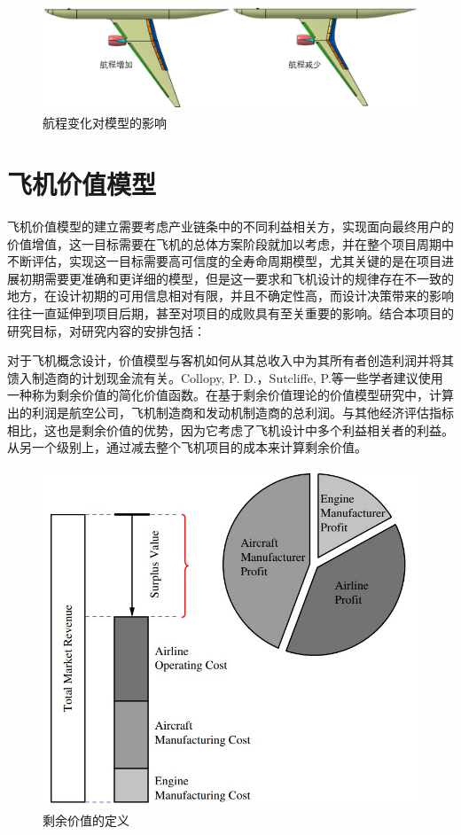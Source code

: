 \documentclass[12pt,a4paper]{report}
\begin{document}
\begin{figure}[hbt!]
\centering
\includegraphics[width=1\textwidth]{Range.PNG}
\caption{航程变化对模型的影响}
\label{fig:Range}
\end{figure}

\section{飞机价值模型}

飞机价值模型的建立需要考虑产业链条中的不同利益相关方，实现面向最终用户的价值增值，这一目标需要在飞机的总体方案阶段就加以考虑，并在整个项目周期中不断评估，实现这一目标需要高可信度的全寿命周期模型，尤其关键的是在项目进展初期需要更准确和更详细的模型，但是这一要求和飞机设计的规律存在不一致的地方，在设计初期的可用信息相对有限，并且不确定性高，而设计决策带来的影响往往一直延伸到项目后期，甚至对项目的成败具有至关重要的影响。结合本项目的研究目标，对研究内容的安排包括：

对于飞机概念设计，价值模型与客机如何从其总收入中为其所有者创造利润并将其馈入制造商的计划现金流有关。Collopy, P. D.\cite{collopy1997surplus}，Sutcliffe, P.\cite{sutcliffe2010development}等一些学者建议使用一种称为剩余价值的简化价值函数。在基于剩余价值理论的价值模型研究中，计算出的利润是航空公司，飞机制造商和发动机制造商的总利润。与其他经济评估指标相比，这也是剩余价值的优势，因为它考虑了飞机设计中多个利益相关者的利益。从另一个级别上，通过减去整个飞机项目的成本来计算剩余价值。

\begin{figure}[!htp]
  \centering
  \includegraphics[width=.6\textwidth]{eps/剩余价值组成.jpg}
  \caption{剩余价值的定义\cite{Desai2017development}}
 \label{fig:surplusvalue}
\end{figure}
\end{document}
